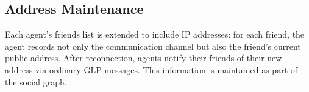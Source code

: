 
\subsection{Address Maintenance}
\label{sec:addr-maintenance}
Each agent's friends list is extended to include IP addresses: for each friend, the agent records not only the communication channel but also the friend's current public address.  After reconnection, agents notify their friends of their new address via ordinary GLP messages.  This information is maintained as part of the social graph.






